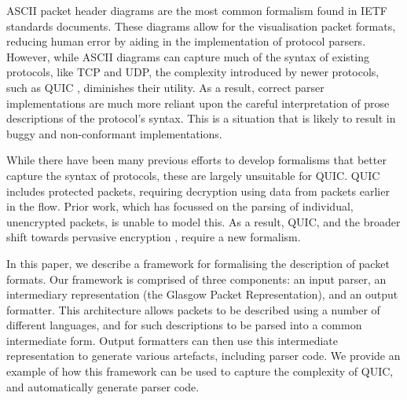 \documentclass[10pt,sigconf]{acmart}
\begin{document}
ASCII packet header diagrams are the most common formalism found in IETF standards
documents. These diagrams allow for the visualisation packet formats, reducing human error
by aiding in the implementation of protocol parsers. However, while ASCII diagrams can
capture much of the syntax of existing protocols, like TCP and UDP, the complexity
introduced by newer protocols, such as QUIC \cite{draft-ietf-quic-transport-latest},
diminishes their utility. As a result, correct parser implementations are much more
reliant upon the careful interpretation of prose descriptions of the protocol's syntax.
This is a situation that is likely to result in buggy and non-conformant implementations.


While there have been many previous efforts to develop formalisms that better capture the
syntax of protocols, these are largely unsuitable for QUIC. QUIC includes protected
packets, requiring decryption using data from packets earlier in the flow. Prior work,
which has focussed on the parsing of individual, unencrypted packets, is unable to model
this. As a result, QUIC, and the broader shift towards pervasive encryption
\cite{rfc7258}, require a new formalism.


In this paper, we describe a framework for formalising the description of packet formats.
Our framework is comprised of three components: an input parser, an intermediary
representation (the Glasgow Packet Representation), and an output formatter. This
architecture allows packets to be described using a number of different languages, and for
such descriptions to be parsed into a common intermediate form. Output formatters can then
use this intermediate representation to generate various artefacts, including parser code.
We provide an example of how this framework can be used to capture the complexity of QUIC,
and automatically generate parser code.
\end{document}
